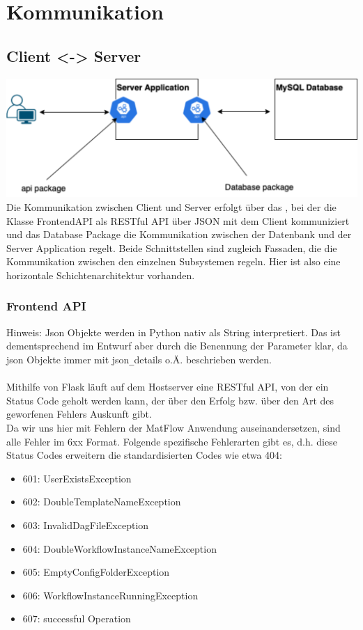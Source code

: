 \section{Kommunikation}

\subsection{Client <-> Server} 
\includegraphics[width=1\textwidth]{res/Kommunikation.png}
Die Kommunikation zwischen Client und Server erfolgt über das , bei der die Klasse FrontendAPI 
als RESTful API über JSON mit dem Client kommuniziert und das Database Package die Kommunikation 
zwischen der Datenbank und der Server Application regelt. Beide Schnittstellen sind zugleich Fassaden, die die Kommunikation
zwischen den einzelnen Subsystemen regeln.
Hier ist also eine horizontale Schichtenarchitektur vorhanden.

\subsubsection{Frontend API}
Hinweis: Json Objekte werden in Python nativ als String interpretiert. Das ist dementsprechend im Entwurf aber durch die 
Benennung der Parameter klar, da json Objekte immer mit json\texttt{\_}details o.Ä. beschrieben werden. \\ \\
Mithilfe von Flask läuft auf dem Hostserver eine RESTful API, von der ein Status Code geholt werden kann, der über den Erfolg 
bzw. über den Art des geworfenen Fehlers Auskunft gibt.\\ 
Da wir uns hier mit Fehlern der MatFlow Anwendung auseinandersetzen, sind alle Fehler im 6xx Format.
Folgende spezifische Fehlerarten gibt es, d.h. diese Status Codes erweitern die standardisierten Codes wie etwa 404:
\begin{itemize}
    \item 601: UserExistsException
    \item 602: DoubleTemplateNameException
    \item 603: InvalidDagFileException
    \item 604: DoubleWorkflowInstanceNameException
    \item 605: EmptyConfigFolderException
    \item 606: WorkflowInstanceRunningException
    \item 607: successful Operation
\end{itemize}


